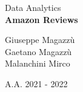\begin{titlepage}
  \vfill
  {\LARGE Data Analytics}\\[1cm]
  {\Huge\bfseries Amazon Reviews}\\[0.4cm]
  \vfill


  \large
  Giuseppe Magazzù \\
  Gaetano Magazzù \\
  Malanchini Mirco \\[0.4cm]
  \vfill


  {\large A.A. 2021 - 2022}\\[2cm]


  \vfill %
\end{titlepage}
